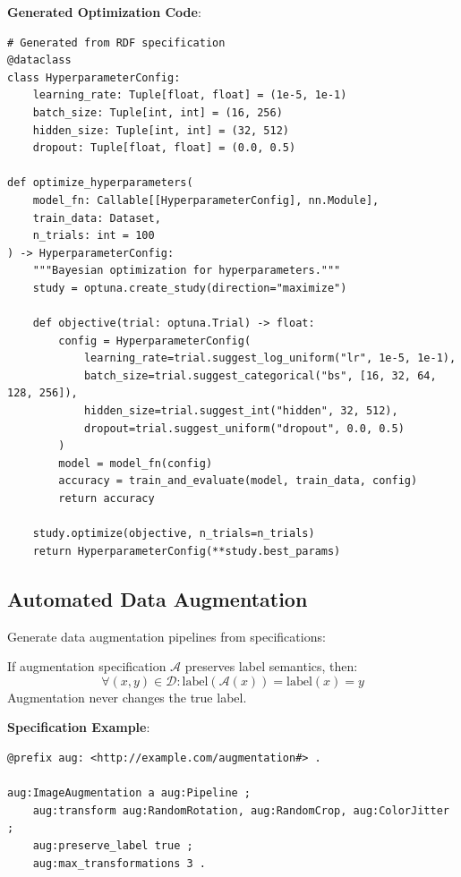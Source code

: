\textbf{Generated Optimization Code}:

\begin{verbatim}
# Generated from RDF specification
@dataclass
class HyperparameterConfig:
    learning_rate: Tuple[float, float] = (1e-5, 1e-1)
    batch_size: Tuple[int, int] = (16, 256)
    hidden_size: Tuple[int, int] = (32, 512)
    dropout: Tuple[float, float] = (0.0, 0.5)

def optimize_hyperparameters(
    model_fn: Callable[[HyperparameterConfig], nn.Module],
    train_data: Dataset,
    n_trials: int = 100
) -> HyperparameterConfig:
    """Bayesian optimization for hyperparameters."""
    study = optuna.create_study(direction="maximize")

    def objective(trial: optuna.Trial) -> float:
        config = HyperparameterConfig(
            learning_rate=trial.suggest_log_uniform("lr", 1e-5, 1e-1),
            batch_size=trial.suggest_categorical("bs", [16, 32, 64, 128, 256]),
            hidden_size=trial.suggest_int("hidden", 32, 512),
            dropout=trial.suggest_uniform("dropout", 0.0, 0.5)
        )
        model = model_fn(config)
        accuracy = train_and_evaluate(model, train_data, config)
        return accuracy

    study.optimize(objective, n_trials=n_trials)
    return HyperparameterConfig(**study.best_params)
\end{verbatim}

\subsection{Automated Data Augmentation}

Generate data augmentation pipelines from specifications:

\begin{theorem}
    If augmentation specification $\mathcal{A}$ preserves label semantics, then:
    \begin{equation}
        \forall (x, y) \in \mathcal{D}: \text{label}(\mathcal{A}(x)) = \text{label}(x) = y
    \end{equation}
    Augmentation never changes the true label.
\end{theorem}

\textbf{Specification Example}:

\begin{verbatim}
@prefix aug: <http://example.com/augmentation#> .

aug:ImageAugmentation a aug:Pipeline ;
    aug:transform aug:RandomRotation, aug:RandomCrop, aug:ColorJitter ;
    aug:preserve_label true ;
    aug:max_transformations 3 .
\end{verbatim}

